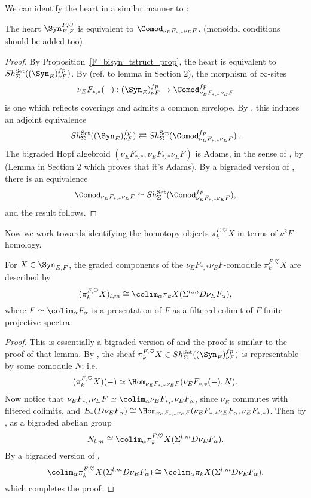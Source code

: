   We can identify the heart in a similar manner to \cite{Pst22}:
  
  \begin{theorem}
      The heart $\Syn_{E,F}^{F,\heartsuit}$ is equivalent to $\Comod_{\nu_EF_{*,*}\nu_EF}$. (monoidal conditions should be added too)
  \end{theorem}
  
  \begin{proof}
      By Proposition~\ref{F_bisyn_tstruct_prop}, the heart is equivalent to $Sh_{\Sigma}^{\mathrm{Set}}((\Syn_E)_{\nu F}^{fp})$. By (ref. to lemma in Section 2), the morphism of $\infty$-sites $$\nu_EF_{*,*}(-):(\Syn_E)_{\nu F}^{fp}\to\Comod_{\nu_EF_{*,*}\nu_EF}^{fp}$$ is one which reflects coverings and admits a common envelope. By \cite[Rem. 2.50]{Pst22}, this induces an adjoint equivalence $$Sh_{\Sigma}^{\mathrm{Set}}((\Syn_E)_{\nu F}^{fp})\rightleftarrows Sh_{\Sigma}^{\mathrm{Set}}(\Comod_{\nu_EF_{*,*}\nu_EF}^{fp})\,.$$
  The bigraded Hopf algebroid $(\nu_EF_{*,*},\nu_EF_{*,*}\nu_EF)$ is Adams, in the sense of \cite[Def. 3.1]{Pst22}, by (Lemma in Section 2 which proves that it's Adams). By a bigraded version of \cite[2.1.12]{GH05}, \cite[Thm. 3.2]{Pst22} there is an equivalence
  $$
  \Comod_{\nu_EF_{*,*}\nu_EF}\simeq Sh_{\Sigma}^{\mathrm{Set}}(\Comod_{\nu_EF_{*,*}\nu_EF}^{fp}),
  $$
  and the result follows.
  \end{proof}
  
  Now we work towards identifying the homotopy objects $\pi_k^{F,\heartsuit}X$ in terms of $\nu^2F$-homology.
  
  \begin{lemma}
  \label{F_dual_tstruct_lemma}
      For $X\in\Syn_{E,F}$, the graded components of the $\nu_EF_{*,*}\nu_EF$-comodule $\pi_k^{F,\heartsuit}X$ are described by
      $$
  (\pi_k^{F,\heartsuit}X)_{l,m} \cong \colim_\alpha \pi_kX(\Sigma^{l,m}D\nu_E F_\alpha),
      $$
      where $F\simeq \colim_\alpha F_\alpha$ is a presentation of $F$ as a filtered colimit of $F$-finite projective spectra.
  \end{lemma}
  
  \begin{proof}
      This is essentially a bigraded version of \cite[Lemma 4.17]{Pst22} and the proof is similar to the proof of that lemma. By \cite[Thm. 2.58]{Pst22}, the sheaf $\pi_k^{F,\heartsuit}X\in Sh_{\Sigma}^{\mathrm{Set}}((\Syn_E)_{\nu F}^{fp})$ is representable by some comodule $N$; i.e. $$(\pi_k^{F,\heartsuit}X)(-)\simeq \Hom_{\nu_EF_{*,*}\nu_EF}(\nu_EF_{*,*}(-),N).$$
      Now notice that $\nu_EF_{*,*}\nu_EF\simeq \colim_\alpha \nu_EF_{*,*}\nu_EF_\alpha$, since $\nu_E$ commutes with filtered colimits, and $E_*(D\nu_EF_\alpha)\cong\Hom_{\nu_EF_{*,*}\nu_EF}(\nu_EF_{*,*}\nu_EF_\alpha,\nu_EF_{*,*})$. Then by \cite[Lemma 3.3]{Pst22}, as a bigraded abelian group
      $$
  N_{l,m}\cong \colim_\alpha \pi_k^{F,\heartsuit}X(\Sigma^{l,m}D\nu_EF_\alpha).
      $$
      By a bigraded version of \cite[Lemma 3.25]{Pst22},
      $$
  \colim_{\alpha}\pi_k^{F,\heartsuit}X(\Sigma^{l,m}D\nu_EF_\alpha)\cong\colim_{\alpha} \pi_kX(\Sigma^{l,m}D\nu_EF_\alpha),
      $$
      which completes the proof.
  \end{proof}
  
